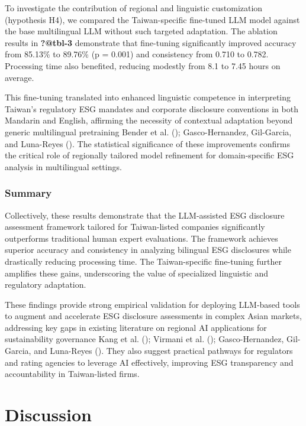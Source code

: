 \documentclass[
  12pt,
]{article}
\begin{document}
To investigate the contribution of regional and linguistic customization
(hypothesis H4), we compared the Taiwan-specific fine-tuned LLM model
against the base multilingual LLM without such targeted adaptation. The
ablation results in \textbf{?@tbl-3} demonstrate that fine-tuning
significantly improved accuracy from 85.13\% to 89.76\% (p = 0.001) and
consistency from 0.710 to 0.782. Processing time also benefited,
reducing modestly from 8.1 to 7.45 hours on average.

This fine-tuning translated into enhanced linguistic competence in
interpreting Taiwan's regulatory ESG mandates and corporate disclosure
conventions in both Mandarin and English, affirming the necessity of
contextual adaptation beyond generic multilingual pretraining Bender et
al. (); Gasco-Hernandez, Gil-Garcia, and
Luna-Reyes (). The statistical
significance of these improvements confirms the critical role of
regionally tailored model refinement for domain-specific ESG analysis in
multilingual settings.

\subsubsection{Summary}\label{summary}

Collectively, these results demonstrate that the LLM-assisted ESG
disclosure assessment framework tailored for Taiwan-listed companies
significantly outperforms traditional human expert evaluations. The
framework achieves superior accuracy and consistency in analyzing
bilingual ESG disclosures while drastically reducing processing time.
The Taiwan-specific fine-tuning further amplifies these gains,
underscoring the value of specialized linguistic and regulatory
adaptation.

These findings provide strong empirical validation for deploying
LLM-based tools to augment and accelerate ESG disclosure assessments in
complex Asian markets, addressing key gaps in existing literature on
regional AI applications for sustainability governance Kang et al.
(); Virmani et al.
(); Gasco-Hernandez, Gil-Garcia, and
Luna-Reyes (). They also suggest
practical pathways for regulators and rating agencies to leverage AI
effectively, improving ESG transparency and accountability in
Taiwan-listed firms.

\section{Discussion}\label{discussion}
\end{document}

